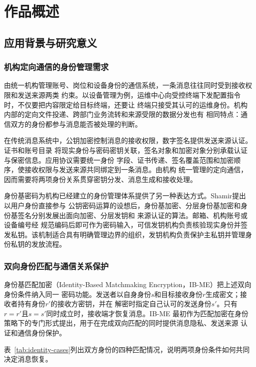\chapter{作品概述}

\section{应用背景与研究意义}

\subsection{机构定向通信的身份管理需求}

由统一机构管理账号、岗位和设备身份的通信系统，一条消息往往同时受到接收权限和发送来源两类
约束。以设备管理为例，运维中心向受控终端下发配置指令时，不仅要把内容限定给目标终端，还要让
终端只接受其认可的运维身份。机构内部的定向文件投递、跨部门业务流转和来源受限的数据分发也有
相同特点：通信双方的身份都参与消息能否被处理的判断。

在传统消息系统中，公钥加密控制消息的接收权限，数字签名提供发送来源认证。证书和账号目录
将现实身份与密码密钥关联，签名对象和加密对象分别承载认证与保密信息。应用协议需要统一身份
字段、证书传递、签名覆盖范围和加密顺序，使接收权限与发送来源共同绑定到一条消息。由机构
统一管理的定向通信，因而需要将两项身份关系贯穿密钥分发、消息生成和接收处理。

身份基密码为机构已经建立的身份管理体系提供了另一种表达方式。Shamir提出以用户身份直接参与
公钥密码运算的设想后，身份基加密、分层身份基加密和身份基签名分别发展出面向加密、分层发钥和
来源认证的算法\cite{shamir1984,gentrysilverberg2002,hess2003ibs}。邮箱、机构账号或设备编号经
规范编码后即可作为密码输入，可信发钥机构负责核验现实身份并签发私钥。该机制适合具有明确管理边界的组织，发钥机构负责保护主私钥并管理身份私钥的发放流程。

\subsection{双向身份匹配与通信关系保护}

身份基匹配加密（Identity-Based Matchmaking Encryption，IB-ME）把上述双向身份条件纳入同一
密码功能。发送者以自身身份$s$和目标接收身份$r$生成密文；接收者持有身份$r'$的接收方密钥，并在
解密时指定自己认可的发送身份$s'$。只有$r=r'$且$s=s'$同时成立时，接收端才恢复消息。IB-ME
最初作为匹配加密在身份策略下的专门形式提出，用于在完成双向匹配的同时提供消息隐私、发送来源
认证和通信身份保护\cite{ateniese2019me}。

表~\ref{tab:identity-cases}列出双方身份的四种匹配情况，说明两项身份条件如何共同决定消息恢复。

